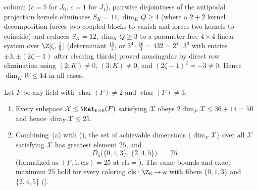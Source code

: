 \begin{outline}
\begin{enumerate}[label=\arabic*.,leftmargin=1.5em]
  column ($c = 5$ for $J_0$, $c = 1$ for $J_1$), pairwise disjointness of the antipodal projection
  kernels eliminates $S_K = 11, \dim_K Q \ge 4$ (where a $2 + 2$ kernel decomposition forces two coupled
  blocks to vanish and forces two kernels to coincide) and reduces $S_K = 12, \dim_K Q \ge 3$ to a
  parameter-free $4 \times 4$ linear system over $\Z[\zeta, \frac{1}{6}]$ (determinant $\frac{16}{3}$,
  or $3^4 \cdot \frac{16}{3} = 432 = 2^4 \cdot 3^3$ with entries $\pm 3, \pm(2\zeta - 1)$ after clearing
  thirds) proved nonsingular by direct row elimination using $(2 : K) \ne 0$, $(3 : K) \ne 0$, and
  $(2\zeta - 1)^2 = -3 \ne 0$. Hence $\dim_K W \le 14$ in all cases.
\end{enumerate}
\end{outline}

\begin{theorem}\label{thm:aperiodic-six-25}
Let $F$ be any field with $\operatorname{char}(F) \ne 2$ and $\operatorname{char}(F) \ne 3$.
\begin{enumerate}[label=(\alph*)]
\item Every subspace $\mathcal{X} \le \Mat_{6\times 6}(F)$ satisfying
    $\mathcal{X}$ obeys
  $2\dim_F \mathcal{X} \le 36 + 14 = 50$ and hence $\dim_F \mathcal{X} \le 25$.
\item Combining~(a) with \cite[Theorem~3.2]{ClassUniformMemo2026}
  (), the set of achievable dimensions
  $\{\dim_F \mathcal{X}\}$ over all $\mathcal{X}$ satisfying
    $\mathcal{X}$
  has greatest element $25$, and
  \[
    D_1\bigl(\{0,1,3\},\,\{2,4,5\}\bigr) \;=\; 25
  \]
  (formalized as $(F, 1, \mathrm{cls}) = 25$ at
  $\mathrm{cls} = {}$).
  The same bounds and exact maximum $25$ hold for every coloring $\mathrm{cls} : \Z_6 \to \kappa$ with
  fibers $\{0,1,3\}$ and $\{2,4,5\}$ ().
\end{enumerate}
\end{theorem}
